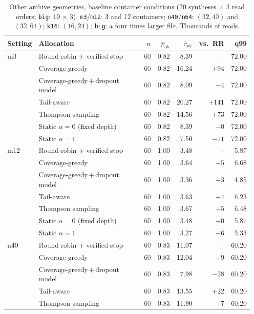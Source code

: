 \begin{table}[!t]
\centering
\caption{Other archive geometries, baseline container conditions (20 syntheses $\times$ 3 read orders; \texttt{big}: 10 $\times$ 3).  \texttt{m3}/\texttt{m12}: 3 and 12 containers; \texttt{n40}/\texttt{n64}: $(32,40)$ and $(32,64)$; \texttt{k16}: $(16,24)$; \texttt{big}: a four times larger file.  Thousands of reads.}
\label{tab:r4geom}
\scriptsize
\setlength{\tabcolsep}{3pt}
\begin{tabular}{@{}llrrrrr@{}}
\toprule
Setting & Allocation & $n$ & $p_{\text{ok}}$ & $\bar r_{\text{ok}}$ & vs.\ RR & q99 \\
\midrule
m3 & Round-robin + verified stop & 60 & 0.82 & 8.39 & -- & 72.00 \\
 & Coverage-greedy & 60 & 0.82 & 16.24 & $+94$ & 72.00 \\
 & Coverage-greedy\,+\,dropout model & 60 & 0.82 & 8.09 & $-4$ & 72.00 \\
 & Tail-aware & 60 & 0.82 & 20.27 & $+141$ & 72.00 \\
 & Thompson sampling & 60 & 0.82 & 14.56 & $+73$ & 72.00 \\
 & Static $\alpha{=}0$ (fixed depth) & 60 & 0.82 & 8.39 & $+0$ & 72.00 \\
 & Static $\alpha{=}1$ & 60 & 0.82 & 7.50 & $-11$ & 72.00 \\
\midrule
m12 & Round-robin + verified stop & 60 & 1.00 & 3.48 & -- & 5.87 \\
 & Coverage-greedy & 60 & 1.00 & 3.64 & $+5$ & 6.68 \\
 & Coverage-greedy\,+\,dropout model & 60 & 1.00 & 3.36 & $-3$ & 4.85 \\
 & Tail-aware & 60 & 1.00 & 3.63 & $+4$ & 6.23 \\
 & Thompson sampling & 60 & 1.00 & 3.67 & $+5$ & 6.48 \\
 & Static $\alpha{=}0$ (fixed depth) & 60 & 1.00 & 3.48 & $+0$ & 5.87 \\
 & Static $\alpha{=}1$ & 60 & 1.00 & 3.27 & $-6$ & 5.33 \\
\midrule
n40 & Round-robin + verified stop & 60 & 0.83 & 11.07 & -- & 60.20 \\
 & Coverage-greedy & 60 & 0.83 & 12.04 & $+9$ & 60.20 \\
 & Coverage-greedy\,+\,dropout model & 60 & 0.83 & 7.98 & $-28$ & 60.20 \\
 & Tail-aware & 60 & 0.83 & 13.55 & $+22$ & 60.20 \\
 & Thompson sampling & 60 & 0.83 & 11.90 & $+7$ & 60.20 \\

\end{tabular}
\end{table}
